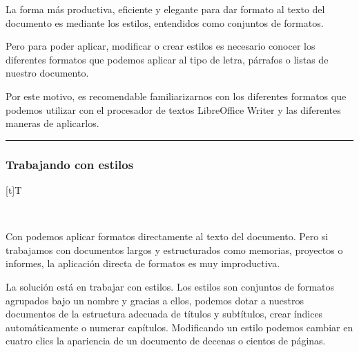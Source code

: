 \documentclass[letterpaper,10pt,spanish]{sphinxmanual}
\let\sphinxpxdimen\pdfpxdimen\else\newdimen\sphinxpxdimen
\begin{document}
\sphinxAtStartPar
La forma más productiva, eficiente y elegante para dar formato al texto del documento es mediante los estilos, entendidos como conjuntos de formatos.

\sphinxAtStartPar
Pero para poder aplicar, modificar o crear estilos es necesario conocer los diferentes formatos que podemos aplicar al tipo de letra, párrafos o listas de nuestro documento.

\sphinxAtStartPar
Por este motivo, es recomendable familiarizarnos con los diferentes formatos que podemos utilizar con el procesador de textos LibreOffice Writer y las diferentes maneras de aplicarlos.


\bigskip\hrule\bigskip



\subsubsection{Trabajando con estilos}
\label{\detokenize{1_guias/10ofimatica/G1014:trabajando-con-estilos}}

\begin{savenotes}\sphinxattablestart
\sphinxthistablewithglobalstyle
\centering
\begin{tabulary}{\linewidth}[t]{T}
\sphinxtoprule
\sphinxtableatstartofbodyhook

\begin{sphinxfigure-in-table}
\centering
\capstart
\noindent\sphinxincludegraphics[width=200\sphinxpxdimen]{{image026}.png}
\label{\detokenize{1_guias/10ofimatica/G1014:id2}}\end{sphinxfigure-in-table}\relax
\\
\sphinxbottomrule
\end{tabulary}
\sphinxtableafterendhook\par
\sphinxattableend\end{savenotes}

\sphinxAtStartPar
Con  podemos aplicar formatos directamente al texto del documento. Pero si trabajamos con documentos largos y estructurados como memorias, proyectos o informes, la aplicación directa de formatos es muy improductiva.

\sphinxAtStartPar
La solución está en trabajar con estilos. Los estilos son conjuntos de formatos agrupados bajo un nombre y gracias a ellos, podemos dotar a nuestros documentos de la estructura adecuada de títulos y subtítulos, crear índices automáticamente o numerar capítulos. Modificando un estilo podemos cambiar en cuatro clics la apariencia de un documento de decenas o cientos de páginas.
\end{document}
